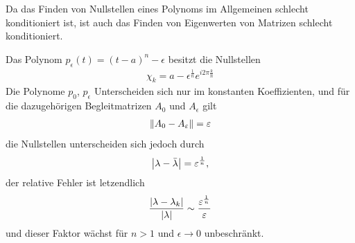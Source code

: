 \documentclass{report}
\begin{document}
	\begin{corollary}
		Da das Finden von Nullstellen eines Polynoms im Allgemeinen schlecht konditioniert ist, ist auch das Finden von Eigenwerten von Matrizen schlecht konditioniert.
	\end{corollary}
	\begin{example}
		Das Polynom $p_{\epsilon}(t) = (t-a)^n - \epsilon$ besitzt die Nullstellen 
		\begin{align*}
			\chi_k = a - \epsilon ^ \frac{1}{n} e^{i2\pi \frac{k}{n}}
		\end{align*}
		Die Polynome $p_0$, $p_\epsilon$ Unterscheiden sich nur im konstanten Koeffizienten, und für die dazugehörigen Begleitmatrizen $A_0$ und $A_\epsilon$ gilt
		\begin{align*}
			\norm{A_0 - A_\varepsilon} = \varepsilon
		\end{align*}
		die Nullstellen unterscheiden sich jedoch durch
		\begin{align*}
			\abs{\lambda - \bar \lambda} = \varepsilon ^{\frac{1}{n}},
		\end{align*}
		der relative Fehler ist letzendlich
		\begin{align*}
			\frac{\abs{\lambda - \lambda_k}}{\abs{\lambda}} \sim \frac{\varepsilon^{\frac{1}{n}}}{\varepsilon}
		\end{align*}
		und dieser Faktor wächst für $n > 1$ und $\epsilon \to 0$ unbeschränkt.
	\end{example}
\end{document}

